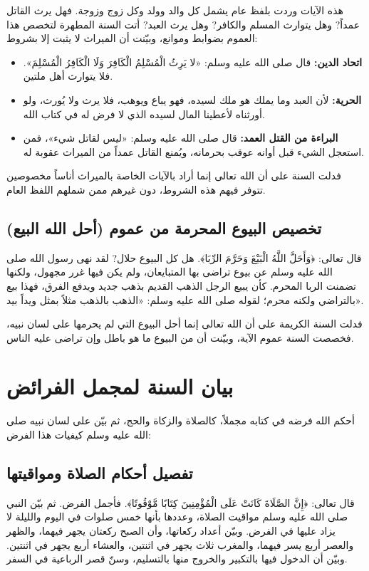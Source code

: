 هذه الآيات وردت بلفظ عام يشمل كل والد وولد وكل زوج وزوجة. فهل يرث القاتل عمداً? وهل يتوارث المسلم والكافر? وهل يرث العبد?
أتت السنة المطهرة لتخصص هذا العموم بضوابط وموانع، وبيّنت أن الميراث لا يثبت إلا بشروط:
\begin{itemize}
    \item \textbf{اتحاد الدين:} قال صلى الله عليه وسلم: «لا يَرِثُ الْمُسْلِمُ الْكَافِرَ وَلَا الْكَافِرُ الْمُسْلِمَ». فلا يتوارث أهل ملتين.
    \item \textbf{الحرية:} لأن العبد وما يملك هو ملك لسيده، فهو يباع ويوهب، فلا يرث ولا يُورث، ولو أورثناه لأعطينا المال لسيده الذي لا فرض له في كتاب الله.
    \item \textbf{البراءة من القتل العمد:} قال صلى الله عليه وسلم: «ليس لقاتل شيء»، فمن استعجل الشيء قبل أوانه عوقب بحرمانه، ويُمنع القاتل عمداً من الميراث عقوبة له.
\end{itemize}
فدلت السنة على أن الله تعالى إنما أراد بالآيات الخاصة بالميراث أناساً مخصوصين تتوفر فيهم هذه الشروط، دون غيرهم ممن شملهم اللفظ العام.

\subsection{تخصيص البيوع المحرمة من عموم (أحل الله البيع)}
قال تعالى: ﴿وَأَحَلَّ اللَّهُ الْبَيْعَ وَحَرَّمَ الرِّبَا﴾. هل كل البيوع حلال? 
لقد نهى رسول الله صلى الله عليه وسلم عن بيوع تراضى بها المتبايعان، ولم يكن فيها غرر مجهول، ولكنها تضمنت الربا المحرم. كأن يبيع الرجل الذهب القديم بذهب جديد ويدفع الفرق، فهذا بيع بالتراضي ولكنه محرم؛ لقوله صلى الله عليه وسلم: «الذهب بالذهب مثلاً بمثل ويداً بيد».

فدلت السنة الكريمة على أن الله تعالى إنما أحل البيوع التي لم يحرمها على لسان نبيه، فخصصت السنة عموم الآية، وبيّنت أن من البيوع ما هو باطل وإن تراضى عليه الناس.

\section{بيان السنة لمجمل الفرائض}
أحكم الله فرضه في كتابه مجملاً، كالصلاة والزكاة والحج، ثم بيّن على لسان نبيه صلى الله عليه وسلم كيفيات هذا الفرض:

\subsection{تفصيل أحكام الصلاة ومواقيتها}
قال تعالى: ﴿إِنَّ الصَّلَاةَ كَانَتْ عَلَى الْمُؤْمِنِينَ كِتَابًا مَّوْقُوتًا﴾. فأجمل الفرض. 
ثم بيّن النبي صلى الله عليه وسلم مواقيت الصلاة، وعددها بأنها خمس صلوات في اليوم والليلة لا يزاد عليها في الفرض. وبيّن أعداد ركعاتها، وأن الصبح ركعتان يجهر فيهما، والظهر والعصر أربع يسر فيهما، والمغرب ثلاث يجهر في اثنتين، والعشاء أربع يجهر في اثنتين. وبيّن أن الدخول فيها بالتكبير والخروج منها بالتسليم، وسنّ قصر الرباعية في السفر.

